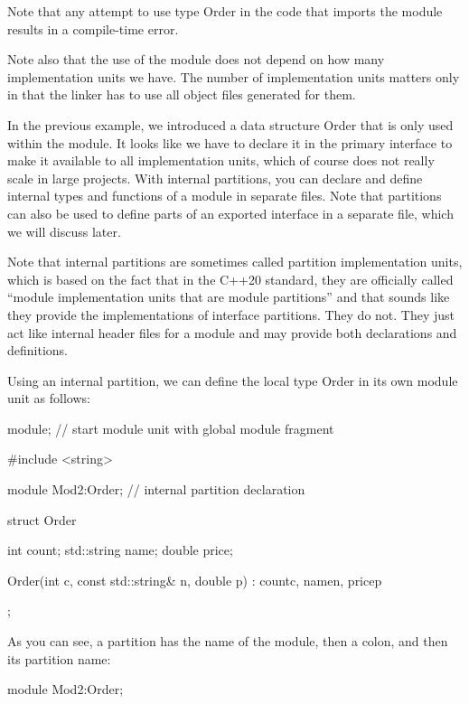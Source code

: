 Note that any attempt to use type Order in the code that imports the module results in a compile-time error.

Note also that the use of the module does not depend on how many implementation units we have. The number of implementation units matters only in that the linker has to use all object files generated for them.


In the previous example, we introduced a data structure Order that is only used within the module. It looks like we have to declare it in the primary interface to make it available to all implementation units, which of course does not really scale in large projects. With internal partitions, you can declare and define internal types and functions of a module in separate files. Note that partitions can also be used to define parts of an exported interface in a separate file, which we will discuss later.

Note that internal partitions are sometimes called partition implementation units, which is based on the fact that in the C++20 standard, they are officially called “module implementation units that are module partitions” and that sounds like they provide the implementations of interface partitions. They do not. They just act like internal header files for a module and may provide both declarations and definitions.


Using an internal partition, we can define the local type Order in its own module unit as follows:


\begin{cpp}
module; // start module unit with global module fragment

#include <string>

module Mod2:Order; // internal partition declaration

struct Order {
	int count;
	std::string name;
	double price;
	
	Order(int c, const std::string& n, double p)
		: count{c}, name{n}, price{p} {
	}
};
\end{cpp}

As you can see, a partition has the name of the module, then a colon, and then its partition name:

\begin{cpp}
module Mod2:Order;
\end{cpp}

